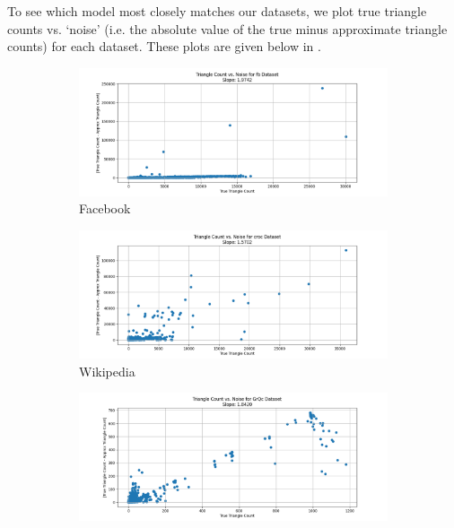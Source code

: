 \documentclass[11pt, margin=1in]{article}
\begin{document}
To see which model most closely matches our datasets, we plot true triangle counts vs. `noise' (i.e. the absolute value of the true minus approximate triangle counts) for each dataset.
These plots are given below in .

\begin{figure}[H]
    \centering

    \begin{subfigure}[b]{0.49\textwidth}
        \centering
        \includegraphics[width=\textwidth]{plots/triangle-counts-vs-noise/fb_triangle_count_vs_noise.png}
        \caption{Facebook}
        \label{fig:tri_vs_noise_fb}
    \end{subfigure}
    \hfill
    \begin{subfigure}[b]{0.49\textwidth}
        \centering
        \includegraphics[width=\textwidth]{plots/triangle-counts-vs-noise/croc_triangle_count_vs_noise.png}
        \caption{Wikipedia}
        \label{fig:tri_vs_noise_croc}
    \end{subfigure}
    \hfill
    \begin{subfigure}[b]{0.49\textwidth}
        \centering
        \includegraphics[width=\textwidth]{plots/triangle-counts-vs-noise/GrQc_triangle_count_vs_noise.png}

\end{subfigure}
\end{figure}
\end{document}
